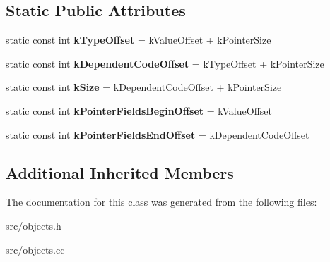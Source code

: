 \subsection*{Static Public Attributes}
\begin{DoxyCompactItemize}
\item 
\hypertarget{classv8_1_1internal_1_1_property_cell_abf2ddebd0088c12bd0adf0c562bdc5cc}{}static const int {\bfseries k\+Type\+Offset} = k\+Value\+Offset + k\+Pointer\+Size\label{classv8_1_1internal_1_1_property_cell_abf2ddebd0088c12bd0adf0c562bdc5cc}

\item 
\hypertarget{classv8_1_1internal_1_1_property_cell_a4170212f9537f0386e47d0cb3992862d}{}static const int {\bfseries k\+Dependent\+Code\+Offset} = k\+Type\+Offset + k\+Pointer\+Size\label{classv8_1_1internal_1_1_property_cell_a4170212f9537f0386e47d0cb3992862d}

\item 
\hypertarget{classv8_1_1internal_1_1_property_cell_aebba1cc2196a61c1f8e639175a9a83d5}{}static const int {\bfseries k\+Size} = k\+Dependent\+Code\+Offset + k\+Pointer\+Size\label{classv8_1_1internal_1_1_property_cell_aebba1cc2196a61c1f8e639175a9a83d5}

\item 
\hypertarget{classv8_1_1internal_1_1_property_cell_a2124652b9ed706cca12d0ea32d3f9ec9}{}static const int {\bfseries k\+Pointer\+Fields\+Begin\+Offset} = k\+Value\+Offset\label{classv8_1_1internal_1_1_property_cell_a2124652b9ed706cca12d0ea32d3f9ec9}

\item 
\hypertarget{classv8_1_1internal_1_1_property_cell_ab94bf9324dfa02d1ac67aac334083c20}{}static const int {\bfseries k\+Pointer\+Fields\+End\+Offset} = k\+Dependent\+Code\+Offset\label{classv8_1_1internal_1_1_property_cell_ab94bf9324dfa02d1ac67aac334083c20}

\end{DoxyCompactItemize}
\subsection*{Additional Inherited Members}


The documentation for this class was generated from the following files\+:\begin{DoxyCompactItemize}
\item 
src/objects.\+h\item 
src/objects.\+cc\end{DoxyCompactItemize}
